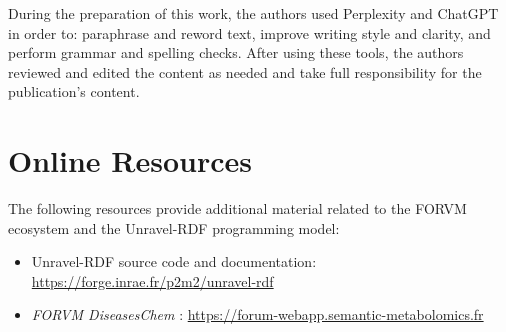 \documentclass[
]{ceurart}
\begin{document}
During the preparation of this work, the authors used Perplexity and
ChatGPT in order to: paraphrase and reword text, improve writing
style and clarity, and perform grammar and spelling checks. After using these
tools, the authors reviewed and edited the content as needed and take
full responsibility for the publication’s content.




\appendix



\section{Online Resources}

The following resources provide additional material related to the
FORVM ecosystem and the Unravel-RDF programming model:
\begin{itemize}
  \item Unravel-RDF source code and documentation:
    \href{https://forge.inrae.fr/p2m2/unravel-rdf}{https://forge.inrae.fr/p2m2/unravel-rdf}
  \item \textit{FORVM DiseasesChem} :
    \href{https://forum-webapp.semantic-metabolomics.fr}{https://forum-webapp.semantic-metabolomics.fr}
\end{itemize}
\end{document}
